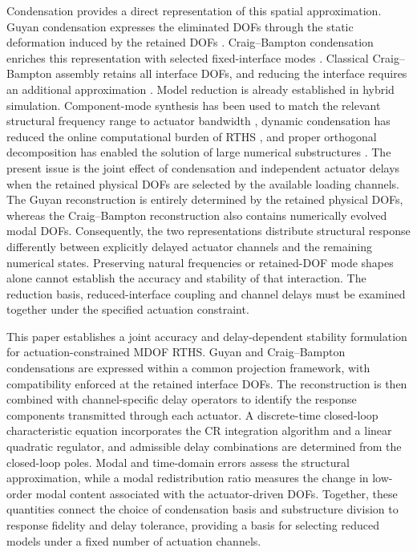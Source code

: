 \documentclass[a4paper,fleqn,review,12pt]{cas-sc}
\numberwithin{equation}{section}
\begin{document}
Condensation provides a direct representation of this spatial approximation. Guyan condensation expresses the eliminated DOFs through the static deformation induced by the retained DOFs \cite{Guyan1965}. Craig--Bampton condensation enriches this representation with selected fixed-interface modes \cite{Craig1968}. Classical Craig--Bampton assembly retains all interface DOFs, and reducing the interface requires an additional approximation \cite{Krattiger2019}. Model reduction is already established in hybrid simulation. Component-mode synthesis has been used to match the relevant structural frequency range to actuator bandwidth \cite{Miraglia2020}, dynamic condensation has reduced the online computational burden of RTHS \cite{Mucha2023}, and proper orthogonal decomposition has enabled the solution of large numerical substructures \cite{ZhangPOD2024}. The present issue is the joint effect of condensation and independent actuator delays when the retained physical DOFs are selected by the available loading channels. The Guyan reconstruction is entirely determined by the retained physical DOFs, whereas the Craig--Bampton reconstruction also contains numerically evolved modal DOFs. Consequently, the two representations distribute structural response differently between explicitly delayed actuator channels and the remaining numerical states. Preserving natural frequencies or retained-DOF mode shapes alone cannot establish the accuracy and stability of that interaction. The reduction basis, reduced-interface coupling and channel delays must be examined together under the specified actuation constraint.

This paper establishes a joint accuracy and delay-dependent stability formulation for actuation-constrained MDOF RTHS. Guyan and Craig--Bampton condensations are expressed within a common projection framework, with compatibility enforced at the retained interface DOFs. The reconstruction is then combined with channel-specific delay operators to identify the response components transmitted through each actuator. A discrete-time closed-loop characteristic equation incorporates the CR integration algorithm and a linear quadratic regulator, and admissible delay combinations are determined from the closed-loop poles. Modal and time-domain errors assess the structural approximation, while a modal redistribution ratio measures the change in low-order modal content associated with the actuator-driven DOFs. Together, these quantities connect the choice of condensation basis and substructure division to response fidelity and delay tolerance, providing a basis for selecting reduced models under a fixed number of actuation channels.
\end{document}
